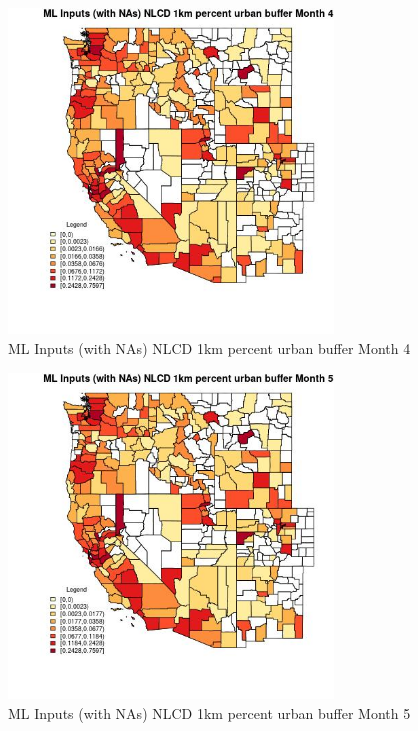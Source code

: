\begin{figure} 
\centering  
\includegraphics[width=0.77\textwidth]{Code_Outputs/Report_ML_input_PM25_Step4_part_f_de_duplicated_aves_prioritize_24hr_obswNAs_CountyNLCD_1km_percent_urban_buffermedianMonth4.jpg} 
\caption{\label{fig:Report_ML_input_PM25_Step4_part_f_de_duplicated_aves_prioritize_24hr_obswNAsCountyNLCD_1km_percent_urban_buffermedianMonth4}ML Inputs (with NAs) NLCD 1km percent urban buffer Month 4} 
\end{figure} 
 

\begin{figure} 
\centering  
\includegraphics[width=0.77\textwidth]{Code_Outputs/Report_ML_input_PM25_Step4_part_f_de_duplicated_aves_prioritize_24hr_obswNAs_CountyNLCD_1km_percent_urban_buffermedianMonth5.jpg} 
\caption{\label{fig:Report_ML_input_PM25_Step4_part_f_de_duplicated_aves_prioritize_24hr_obswNAsCountyNLCD_1km_percent_urban_buffermedianMonth5}ML Inputs (with NAs) NLCD 1km percent urban buffer Month 5} 
\end{figure} 
 

